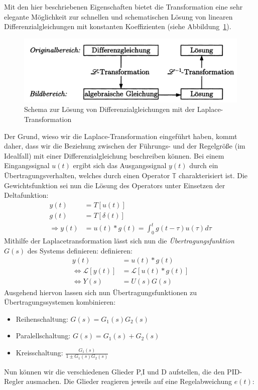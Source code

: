 Mit den hier beschriebenen Eigenschaften bietet die Transformation eine sehr
elegante Möglichkeit zur schnellen und schematischen Lösung von linearen Differenzialgleichungen
mit konstanten Koeffizienten (siehe Abbildung~\ref{fig:laplace1}).
\begin{figure}[h]
\includegraphics[width=14cm]{pics/laplace1}
\caption{Schema zur Lösung von Differenzialgleichungen mit der Laplace-Transformation
\cite{regelungstechnik2}}
\label{fig:laplace1}
\end{figure}
Der Grund, wieso wir die Laplace-Transformation eingeführt haben, kommt daher, dass wir
die Beziehung zwischen der Führungs- und der Regelgröße (im Idealfall) mit einer
Differenzialgleichung beschreiben können.
Bei einem Eingangssignal $u(t)$ ergibt sich das Ausgangssignal $y(t)$ durch ein
Übertragungsverhalten, welches durch einen Operator $\mathbb{T}$ charakterisiert ist.
Die Gewichtsfunktion sei nun die Lösung des Operators unter Einsetzen der Deltafunktion:
\begin{align}
y(t) &= T\left [ u(t) \right ] \\
g(t) &= T \left [ \delta(t) \right ] \\
\Rightarrow y(t) &= u(t) * g(t) = \int_{0}^{t}g(t-\tau)u(\tau)d\tau
\end{align}
Mithilfe der Laplacetransformation lässt sich nun die \textit{Übertragungsfunktion} $G(s)$
des Systems definieren:
definieren:
\begin{align}
y(t) &= u(t) * g(t) \\
\Leftrightarrow \mathcal{L}\left [y(t)\right ] &= \mathcal{L}\left [u(t) * g(t)\right ]\\
\Leftrightarrow Y(s) &= U(s)G(s)
\end{align}
Ausgehend hiervon lassen sich nun Übertragungsfunktionen zu Übertragungssystemen kombinieren:
\begin{itemize}
\item Reihenschaltung: $G(s) = G_1(s)G_2(s)$
\item Paralellschaltung: $G(s) = G_1(s) + G_2(s)$
\item Kreisschaltung: $\frac{G_1(s)}{1\pm G_1(s)G_2(s)}$
\end{itemize}
Nun können wir die verschiedenen Glieder P,I und D aufstellen, die den PID-Regler ausmachen.
Die Glieder reagieren jeweils auf eine Regelabweichung $e(t)$:
